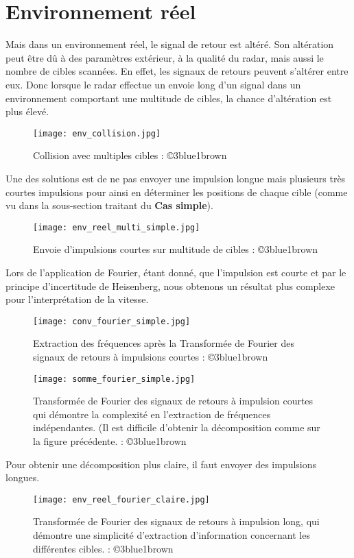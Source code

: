 \documentclass[a4paper]{book}
\begin{document}
\section{Environnement réel}
Mais dans un environnement réel, le signal de retour est altéré. Son altération
peut être dû à des paramètres extérieur, à la qualité du radar, mais aussi le
nombre de cibles scannées. En effet, les signaux de retours peuvent s'altérer
entre eux. Donc lorsque le radar effectue un envoie long d'un signal dans un
environnement comportant une multitude de cibles, la chance d'altération est 
plus élevé.
\begin{figure}[H]
	\centering
	\texttt{[image: env\_collision.jpg]}
	\caption{Collision avec multiples cibles
	: ©3blue1brown }
\end{figure}
Une des solutions est de ne pas envoyer une impulsion longue mais plusieurs très courtes
impulsions pour ainsi en déterminer les positions de chaque cible (comme vu dans
la sous-section traitant du \textbf{Cas simple}).
\begin{figure}[H]
	\centering
	\texttt{[image: env\_reel\_multi\_simple.jpg]}
	\caption{Envoie d'impulsions courtes sur multitude de cibles
	: ©3blue1brown }
\end{figure}
Lors de l'application de Fourier, étant donné, que l'impulsion est courte et par
le principe d'incertitude de Heisenberg, nous obtenons un résultat plus complexe pour
l'interprétation de la vitesse.\hfill \break
\begin{figure}[H]
	\centering
	\texttt{[image: conv\_fourier\_simple.jpg]}
	\caption{Extraction des fréquences après la Transformée de Fourier des
	signaux de retours à impulsions courtes
	: ©3blue1brown }
\end{figure}
\begin{figure}[H]
	\centering
	\texttt{[image: somme\_fourier\_simple.jpg]}
	\caption{Transformée de Fourier des signaux de retours à impulsion
	courtes qui démontre la complexité en l'extraction de fréquences
	indépendantes. (Il est difficile d'obtenir la décomposition comme sur la
	figure précédente.
	: ©3blue1brown }
\end{figure}

Pour obtenir une décomposition plus claire, il faut envoyer des impulsions
longues.
\begin{figure}[H]
	\centering
	\texttt{[image: env\_reel\_fourier\_claire.jpg]}
	\caption{Transformée de Fourier des signaux de retours à impulsion long,
	qui démontre une simplicité d'extraction d'information concernant les
	différentes cibles.
	: ©3blue1brown }
\end{figure}
\end{document}
